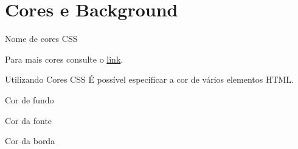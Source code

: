 \documentclass{beamer}
\begin{document}
\section{Cores e Background}
\begin{frame}{Nome de cores CSS}
	\begin{center}
			
			\tiny Para mais cores consulte o \href{https://www.w3schools.com/colors/colors_names.asp}{link}.
		\end{center}
\end{frame}
\begin{frame}{Utilizando Cores CSS}
É possível especificar a cor de vários elementos HTML.
	\begin{center}
		
		\tiny Cor de fundo
	\end{center}
	\begin{center}
		
		\tiny Cor da fonte
	\end{center}
	\begin{center}
		
		\tiny Cor da borda
	\end{center}
\end{frame}

\end{document}
